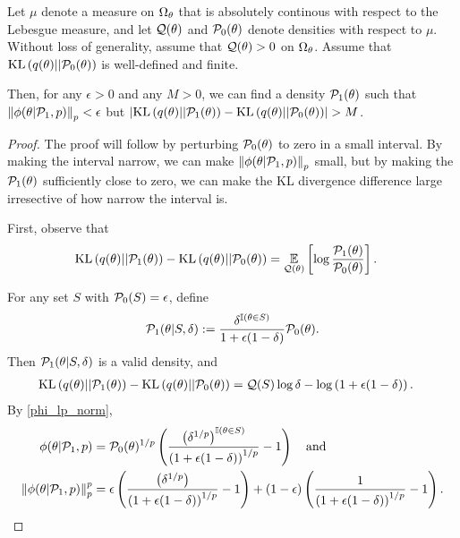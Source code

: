 \begin{thm}
%
Let $\mu$ denote a measure on $\Omega_{\theta}$ that is absolutely continous
with respect to the Lebesgue measure, and let $\mathcal{Q}(\theta)$ and
$\mathcal{P}_{0}(\theta)$ denote densities with respect to $\mu$.  Without loss of
generality, assume that $\mathcal{Q}(\theta) > 0$ on $\Omega_{\theta}$.  Assume that
$\mathrm{KL}\left(q(\theta) || \mathcal{P}_{0}(\theta)\right)$ is well-defined and finite.

Then, for any $\epsilon > 0$ and any $M > 0$, we can find a density
$\mathcal{P}_{1}(\theta)$ such that $\left\Vert\phi(\theta \vert \mathcal{P}_{1}, p)\right\Vert_p < \epsilon$ but
$\left|\mathrm{KL}\left(q(\theta) || \mathcal{P}_{1}(\theta)\right) - \mathrm{KL}\left(q(\theta) || \mathcal{P}_{0}(\theta)\right)\right| > M$.

\begin{proof}
%
The proof will follow by perturbing $\mathcal{P}_{0}(\theta)$ to zero in a small
interval.  By making the interval narrow, we can make $\left\Vert\phi(\theta \vert
\mathcal{P}_{1}, p)\right\Vert_p$ small, but by making the $\mathcal{P}_{1}(\theta)$ sufficiently close to
zero, we can make the KL divergence difference large irresective of how narrow
the interval is.

First, observe that
%
\begin{align*}
%
\KL{q(\theta) || \palt(\theta)} -
\KL{q(\theta) || \pbase(\theta)} ={}&
\expect{\q(\theta)}{\log \frac{\palt(\theta)}{\pbase(\theta)}}.
%
\end{align*}

For any set $S$ with $\mathcal{P}_{0}(S) = \epsilon$, define
%
\begin{align*}
%
\palt(\theta \vert S, \delta) :=
    \frac{\delta^{\ind{\theta \in S}}}{1 + \epsilon(1 - \delta)} \pbase(\theta).
%
\end{align*}
%
Then $\mathcal{P}_{1}(\theta \vert S, \delta)$ is a valid density, and
%
\begin{align*}
%
\KL{q(\theta) || \palt(\theta)} - \KL{q(\theta) || \pbase(\theta)}
    ={}& \q(S) \log \delta - \log\left( 1 + \epsilon(1 - \delta) \right).
%
\end{align*}
%
By \eqref{phi_lp_norm},
%
\begin{align*}
%
\phi(\theta \vert \palt, p) ={}&
    \pbase(\theta)^{1/p} \left(
        \frac{\left(\delta^{1/p}\right)^{\ind{\theta \in S}}}
             {\left( 1 + \epsilon(1 - \delta) \right)^{1/p}} - 1 \right) \mathand\\
\norm{\phi(\theta \vert \palt, p)}_p^p ={}&
\epsilon \left(
   \frac{\left(\delta^{1/p}\right)}
        {\left( 1 + \epsilon(1 - \delta) \right)^{1/p}} - 1 \right) +
(1 - \epsilon) \left(
   \frac{1}
        {\left( 1 + \epsilon(1 - \delta) \right)^{1/p}} - 1 \right).
%
\end{align*}


\end{proof}
\end{thm}

